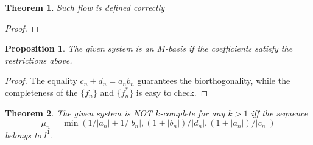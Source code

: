 \documentclass[12pt]{article}
\newtheorem{theorem}{Theorem}
\newtheorem{prop}{Proposition}
\theoremstyle{definition}
\numberwithin{remark}{section}
\numberwithin{theorem}{section}
\numberwithin{prop}{section}
\numberwithin{equation}{section}
\numberwithin{lemma}{section}
\numberwithin{prop_under_lemma}{lemma}
\begin{document}
    \begin{theorem}
        Such flow is defined correctly 
    \end{theorem}
    \begin{proof}
        
    \end{proof}
    \begin{prop}
        The given system is an $M$-basis if the coefficients satisfy the restrictions above.
    \end{prop}
    \begin{proof}
        The equality $c_n + d_n = a_n b_n$ guarantees the bi\-orthogonality,
        while the completeness of the $\{f_n\}$ and $\{f_n^*\}$ is
        easy to check.
    \end{proof}
    
    \begin{theorem}
        The given system is NOT $k$-complete for any $k > 1$ iff the sequence
        $$
            \mu_n = \min(1/|a_n| + 1/|b_n|, (1 + |b_n|)/|d_n|, (1 + |a_n|)/|c_n|)
        $$ belongs to $l^1$.
    \end{theorem}
\end{document}
